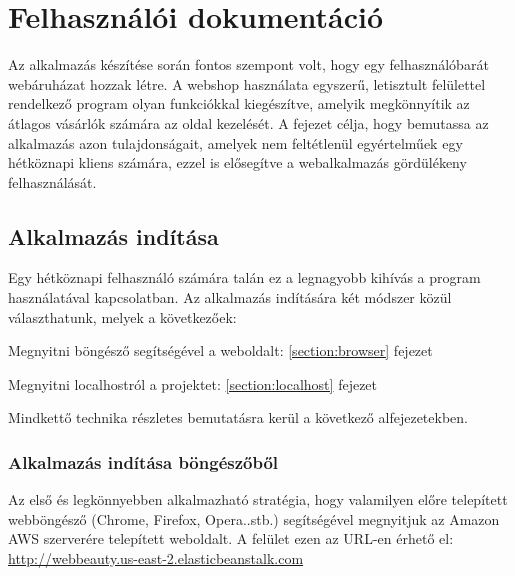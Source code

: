 \chapter{Felhasználói dokumentáció} %
\label{ch:user}

Az alkalmazás készítése során fontos szempont volt, hogy egy felhasználóbarát webáruházat hozzak létre. A webshop használata egyszerű, letisztult felülettel rendelkező program olyan funkciókkal kiegészítve, amelyik megkönnyítik az átlagos vásárlók számára az oldal kezelését. A fejezet célja, hogy bemutassa az alkalmazás azon tulajdonságait, amelyek nem feltétlenül egyértelműek egy hétköznapi kliens számára, ezzel is elősegítve a webalkalmazás gördülékeny felhasználását.


\section{Alkalmazás indítása} %

Egy hétköznapi felhasználó számára talán ez a legnagyobb kihívás a program használatával kapcsolatban. Az alkalmazás indítására két módszer közül választhatunk, melyek a következőek:

\begin{compactenum}
	\item Megnyitni böngésző segítségével a weboldalt: \ref{section:browser} fejezet
	\item Megnyitni localhostról a projektet: \ref{section:localhost} fejezet
\end{compactenum}

\bigskip
Mindkettő technika részletes bemutatásra kerül a következő alfejezetekben.

\label{section:browser}
\subsection{Alkalmazás indítása böngészőből}
Az első és legkönnyebben alkalmazható stratégia, hogy valamilyen előre telepített webböngésző (Chrome, Firefox, Opera..stb.) segítségével megnyitjuk az Amazon AWS\cite{aws} szerverére telepített weboldalt. A felület ezen az URL-en érhető el: \url{http://webbeauty.us-east-2.elasticbeanstalk.com}

\label{section:localhost}

